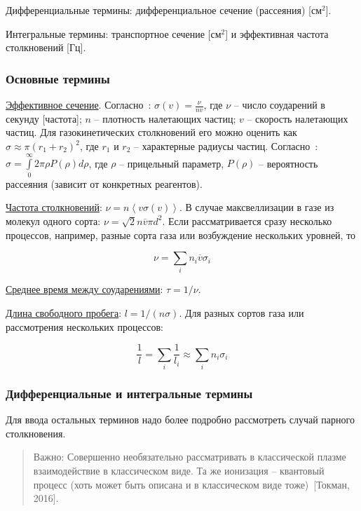 \documentclass[10pt, a4paper]{article}
\newcommand{\Tokman}{~[Токман, 2016]}
\begin{document}
Дифференциальные термины: дифференциальное сечение (рассеяния) [см$^2$].

Интегральные термины: транспортное сечение [см$^2$] и эффективная частота столкновений [Гц].

\subsubsection{Основные термины}

\uline{Эффективное сечение}. Согласно~\cite{raizer}: $\sigma(v) = \frac{\nu}{nv}$, где $\nu$ -- число соударений в секунду [частота]; $n$ -- плотность налетающих частиц; $v$ -- скорость налетающих частиц. Для газокинетических столкновений его можно оценить как $\sigma \approx \pi(r_1+r_2)^2$, где $r_1$ и $r_2$ -- характерные радиусы частиц. Согласно~\cite{astap}: $\sigma=\int\limits_{0}^{\infty} 2\pi \rho P(\rho) d\rho$, где $\rho$ -- прицельный параметр, $P(\rho)$ -- вероятность рассеяния (зависит от конкретных реагентов). 

\uline{Частота столкновений}: $\nu = n\left\langle v\sigma(v)\right\rangle $. В случае максвеллизации в газе из молекул одного сорта: $\nu = \sqrt{2}n\overline{v}\pi d^2$. 
Если рассматривается сразу несколько процессов, например, разные сорта газа или возбуждение нескольких уровней, то

\begin{equation*}
	\nu = \sum_{i}n_i\overline{v}\sigma_i
\end{equation*}

\uline{Среднее время между соударениями}: $\tau = 1/\nu$.

\uline{Длина свободного пробега}: $l = 1/(n\sigma)$.
Для разных сортов газа или рассмотрения нескольких процессов:

\begin{equation*}
	\frac{1}{l} = \sum_{i}\frac{1}{l_i}\approx\sum_{i}n_i\sigma_i
\end{equation*}

\subsubsection{Дифференциальные и интегральные термины}

Для ввода остальных терминов надо более подробно рассмотреть случай парного столкновения.	

\begin{quotation}
	Важно: Совершенно необязательно рассматривать в классической плазме взаимодействие в классическом виде. Та же ионизация -- квантовый процесс (хоть может быть описана и в классическом виде тоже)\Tokman.
\end{quotation}
\end{document}
